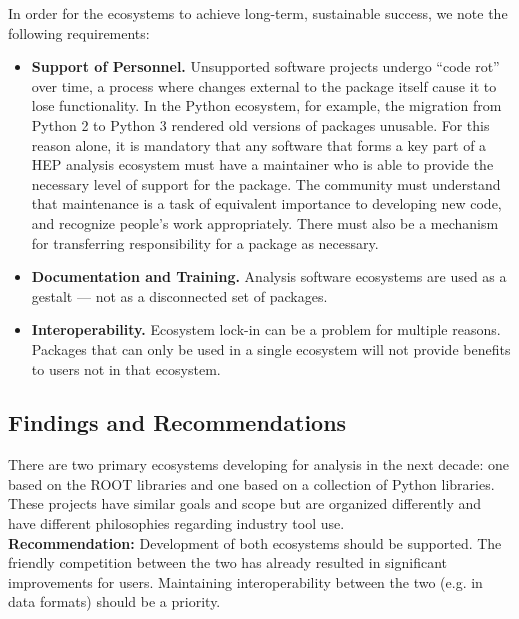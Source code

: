 In order for the ecosystems to achieve long-term, sustainable success, we note the following requirements:
\begin{itemize}
    \item \textbf{Support of Personnel.} Unsupported software projects undergo ``code rot'' over time, a process where changes external to the package itself cause it to lose functionality. In the Python ecosystem, for example, the migration from Python 2 to Python 3 rendered old versions of packages unusable. For this reason alone, it is mandatory that any software that forms a key part of a HEP analysis ecosystem must have a maintainer who is able to provide the necessary level of support for the package. The community must understand that maintenance is a task of equivalent importance to developing new code, and recognize people's work appropriately. There must also be a mechanism for transferring responsibility for a package as necessary.
    \item \textbf{Documentation and Training.} Analysis software ecosystems are used as a gestalt --- not as a disconnected set of packages. 
    \item \textbf{Interoperability.} Ecosystem lock-in can be a problem for multiple reasons. Packages that can only be used in a single ecosystem will not provide benefits to users not in that ecosystem. 
\end{itemize}

\subsection{Findings and Recommendations}
There are two primary ecosystems developing for analysis in the next decade: one based on the ROOT libraries and one based on a collection of Python libraries. These projects have similar goals and scope but are organized differently and have different philosophies regarding industry tool use.\\
\textbf{Recommendation:} Development of both ecosystems should be supported. The friendly competition between the two has already resulted in significant improvements for users. Maintaining interoperability between the two (e.g. in data formats) should be a priority.

